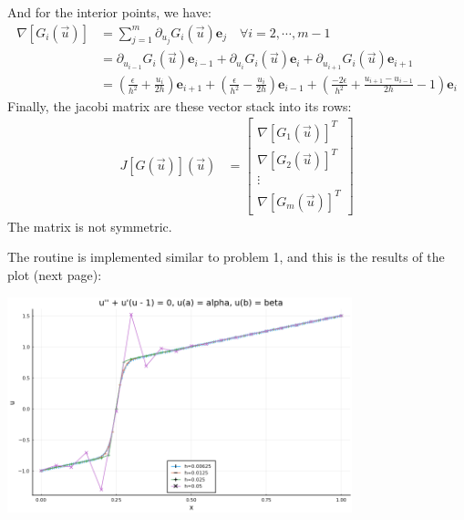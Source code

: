 \documentclass[]{article}
\begin{document}
    And for the interior points, we have: 
    \begin{align*}\tag{4.3}\label{eqn:4.3}
        \nabla[G_i(\vec{u})] &= 
        \sum_{j = 1}^{m}\partial_{u_j}G_i(\vec{u})\mathbf{e}_j \quad \forall i = 2, \cdots, m - 1
        \\
        &= 
        \partial_{u_{i - 1}}G_i(\vec{u})\mathbf{e}_{i - 1} + 
        \partial_{u_{i}}G_i(\vec{u})\mathbf{e}_{i} + 
        \partial_{u_{i + 1}}G_i(\vec{u})\mathbf{e}_{i + 1}
        \\
        &= 
        \left(
            \frac{\epsilon}{h^2} + \frac{u_i}{2h}
        \right)\mathbf{e}_{i + 1} + 
        \left(
            \frac{\epsilon}{h^2} - \frac{u_i}{2h}
        \right)\mathbf{e}_{i - 1} +
        \left(
            \frac{-2\epsilon}{h^2} + 
            \frac{u_{i + 1} - u_{i - 1}}{2h} - 1
        \right)\mathbf{e}_{i}
    \end{align*}
    Finally, the jacobi matrix are these vector stack into its rows: 
    \begin{align*}\tag{4.4}\label{eqn:4.4}
        J[G(\vec{u})](\vec{u}) &= 
        \begin{bmatrix}
            \nabla[G_1(\vec{u})]^T \\
            \nabla[G_2(\vec{u})]^T \\
            \vdots
            \\
            \nabla[G_m(\vec{u})]^T
        \end{bmatrix}
    \end{align*}
    The matrix is not symmetric. 
    \par
    The routine is implemented similar to problem 1, and this is the results of the plot (next page): 
    \begin{center}
        \includegraphics[width=10cm]{problem4_plot.png}
    \end{center}
\end{document}
